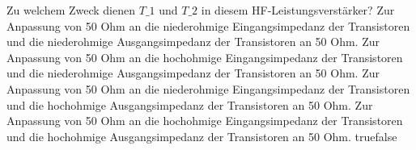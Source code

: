     {Zu welchem Zweck dienen $T\_1$ und $T\_2$ in diesem HF-Leistungsverstärker?}
    {Zur Anpassung von 50 Ohm an die niederohmige Eingangsimpedanz der Transistoren und die niederohmige Ausgangsimpedanz der Transistoren an 50 Ohm.}
    {Zur Anpassung von 50 Ohm an die hochohmige Eingangsimpedanz der Transistoren und die niederohmige Ausgangsimpedanz der Transistoren an 50 Ohm.}
    {Zur Anpassung von 50 Ohm an die niederohmige Eingangsimpedanz der Transistoren und die hochohmige Ausgangsimpedanz der Transistoren an 50 Ohm.}
    {Zur Anpassung von 50 Ohm an die hochohmige Eingangsimpedanz der Transistoren und die hochohmige Ausgangsimpedanz der Transistoren an 50 Ohm.}
    {true}{false}